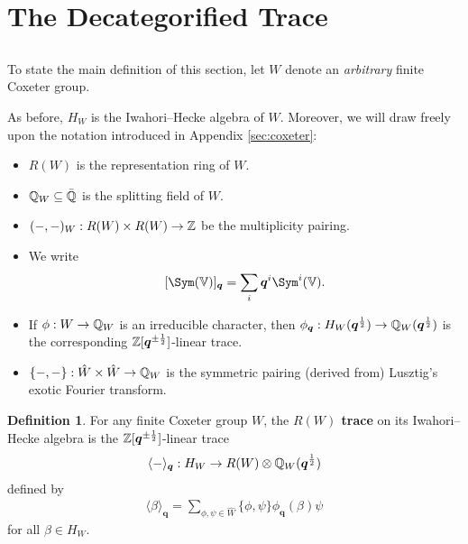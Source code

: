 \documentclass[a4paper,10pt,leqno]{amsart}
\theoremstyle{plain}
\theoremstyle{plain}
\theoremstyle{plain}
\theoremstyle{definition}
\newtheorem{df}[thm]{Definition}
\theoremstyle{remark}
\newcommand{\dfemph}[1]{\textbf{#1}}
\newcommand{\Q}{\bm{q}}
\newcommand{\Tr}[1]{\langle{#1}\rangle_{\Q}}
\begin{document}
\newpage
\section{The Decategorified Trace}\label{sec:decat}

\subsection{}

To state the main definition of this section, let $W$ denote an \emph{arbitrary} finite Coxeter group.

As before, $H_W$ is the Iwahori--Hecke algebra of $W$.
Moreover, we will draw freely upon the notation introduced in Appendix \ref{sec:coxeter}:
\begin{itemize}
\item 	$R(W)$ is the representation ring of $W$.
\item 	$\mathbb{Q}_W \subseteq \bar{\mathbb{Q}}$ is the splitting field of $W$.
\item 	$(-, -)_W : R(W) \times R(W) \to \mathbb{Z}$ be the multiplicity pairing.
\item 	We write 
\begin{align}
{[\Sym(\bb{V})]_{\Q}} = \sum_i {\Q^i} \Sym^i(\bb{V}).
\end{align}
\item 	If $\phi : W \to \mathbb{Q}_W$ is an irreducible character, then $\phi_{\Q} : H_W(\Q^{\frac{1}{2}}) \to \bb{Q}_W(\Q^{\frac{1}{2}})$ is the corresponding $\bb{Z}[\Q^{\pm\frac{1}{2}}]$-linear trace.
\item 	$\{-, -\} : \hat{W} \times \hat{W} \to \mathbb{Q}_W$ is the symmetric pairing (derived from) Lusztig's exotic Fourier transform.
\end{itemize}

\begin{df}
For any finite Coxeter group $W$, the \dfemph{$R(W)$ trace} on its Iwahori--Hecke algebra is the $\bb{Z}[\Q^{\pm\frac{1}{2}}]$-linear trace
\begin{align}
\Tr{-} : H_W \to R(W) \otimes \bb{Q}_W(\Q^{\frac{1}{2}})
\end{align}
defined by
\begin{align}
\Tr{\beta} = \sum_{\phi, \psi \in \hat{W}} {\{\phi, \psi\}} 
\phi_{\Q}(\beta)\psi
\end{align}
for all $\beta \in H_W$.
\end{df}
\end{document}
